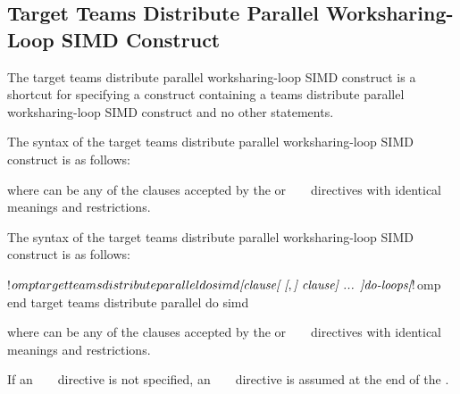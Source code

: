 \subsection{Target Teams Distribute Parallel Worksharing-Loop SIMD Construct}
\label{subsec:Target Teams Distribute Parallel Loop SIMD Construct}
\summary
The target teams distribute parallel worksharing-loop SIMD construct is a shortcut 
for specifying a  construct containing a teams distribute parallel 
worksharing-loop SIMD construct and no other statements.

\syntax
\begin{ccppspecific}
The syntax of the target teams distribute parallel worksharing-loop SIMD construct 
is as follows:

\begin{ompcPragma}
#pragma omp target teams distribute parallel for simd \plc{\}
            \plc{[clause[ [},\plc{] clause] ... ] new-line}
    \plc{for-loops}
\end{ompcPragma}

where  can be any of the clauses accepted by the  or
~  ~
directives with identical meanings and restrictions.
\end{ccppspecific}

\begin{fortranspecific}
The syntax of the target teams distribute parallel worksharing-loop SIMD construct 
is as follows:

\begin{ompfPragma}
!$omp target teams distribute parallel do simd \plc{[clause[ [},\plc{] clause] ... ]}
    \plc{do-loops}
\plc{[}!$omp end target teams distribute parallel do simd\plc{]}
\end{ompfPragma}

where  can be any of the clauses accepted by the
 or ~  ~
directives with identical meanings and restrictions.

If an ~   
~ directive is not specified, an ~
   ~
directive is assumed at the end of the .
\end{fortranspecific}

